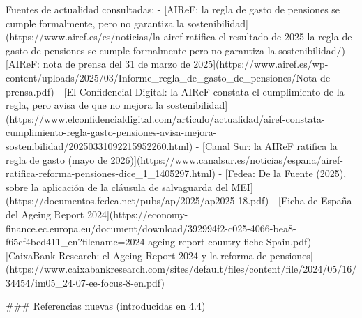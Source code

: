 \documentclass[10pt,a4paper]{article}
\begin{document}
Fuentes de actualidad consultadas:
- [AIReF: la regla de gasto de pensiones se cumple formalmente, pero no garantiza la sostenibilidad](https://www.airef.es/es/noticias/la-airef-ratifica-el-resultado-de-2025-la-regla-de-gasto-de-pensiones-se-cumple-formalmente-pero-no-garantiza-la-sostenibilidad/)
- [AIReF: nota de prensa del 31 de marzo de 2025](https://www.airef.es/wp-content/uploads/2025/03/Informe_regla_de_gasto_de_pensiones/Nota-de-prensa.pdf)
- [El Confidencial Digital: la AIReF constata el cumplimiento de la regla, pero avisa de que no mejora la sostenibilidad](https://www.elconfidencialdigital.com/articulo/actualidad/airef-constata-cumplimiento-regla-gasto-pensiones-avisa-mejora-sostenibilidad/20250331092215952260.html)
- [Canal Sur: la AIReF ratifica la regla de gasto (mayo de 2026)](https://www.canalsur.es/noticias/espana/airef-ratifica-reforma-pensiones-dice_1_1405297.html)
- [Fedea: De la Fuente (2025), sobre la aplicación de la cláusula de salvaguarda del MEI](https://documentos.fedea.net/pubs/ap/2025/ap2025-18.pdf)
- [Ficha de España del Ageing Report 2024](https://economy-finance.ec.europa.eu/document/download/392994f2-c025-4066-bea8-f65cf4bcd411_en?filename=2024-ageing-report-country-fiche-Spain.pdf)
- [CaixaBank Research: el Ageing Report 2024 y la reforma de pensiones](https://www.caixabankresearch.com/sites/default/files/content/file/2024/05/16/34454/im05_24-07-ee-focus-8-en.pdf)

### Referencias nuevas (introducidas en 4.4)
\end{document}
